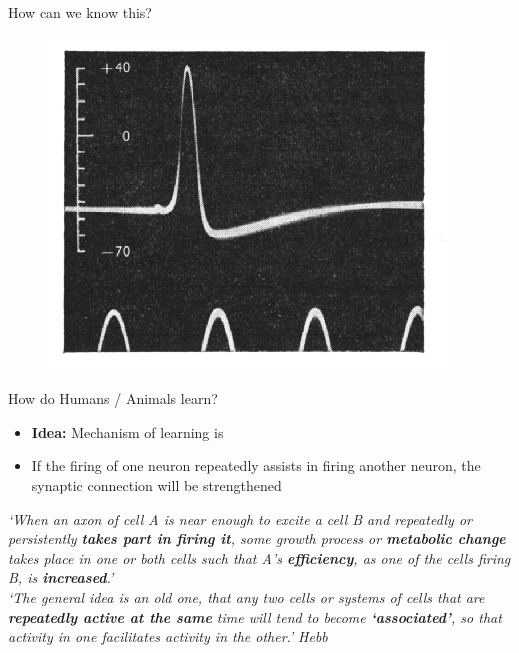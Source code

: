 \begin{frame}{How can we know this?}{}
{\begin{figure}
			\includegraphics[scale=0.3]{10_deep_learning/02_img/spike_potential_squid}
		\end{figure}
	}
\end{frame}


\begin{frame}{How do Humans / Animals learn?}{}
	\footnotesize
	\vspace*{-2mm}
	\begin{itemize}
		\item \textbf{Idea:} Mechanism of learning is 
		\item {} If the firing of one neuron repeatedly assists in firing another neuron,
			the synaptic connection will be strengthened
	\end{itemize}
	
	\begin{boxBlueNoFrame}
		\textit{`When an axon of cell A is near enough to excite a cell B and repeatedly or persistently \textbf{takes part in
			firing it}, some growth process or \textbf{metabolic change} takes place in one or both cells such that
			A's \textbf{efficiency}, as one of the cells firing B, is \textbf{increased}.'} \\[-3mm]

		\textit{`The general idea is an old one, that any two cells or systems of cells that are
			\textbf{repeatedly active at the same} time will tend to become \textbf{`associated'}, so that activity
			in one facilitates activity in the other.'} \hfill \textit{Hebb}
	\end{boxBlueNoFrame}
\end{frame}


